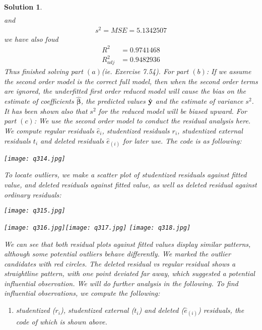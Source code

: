 \documentclass[11pt]{article}
\newtheorem{sol}{Solution}
\begin{document}
\begin{sol}
\begin{align*}
	\end{align*}
	and 
	\begin{align*}
		s^2 = MSE = 5.1342507
	\end{align*}
	we have also foud
	\begin{align*}
		R^2 &= 0.9741468\\
		R^2_{adj} &= 0.9482936
	\end{align*}
	Thus finished solving part $(a)$(ie. Exercise 7.54).\vskip 2mm
	For part $(b)$:\vskip 2mm
	If we assume the second order model is the correct full model, then when the second order terms are ignored, the underfitted first order reduced model will cause the bias on the estimate of coefficients $\hat{{\bm \beta}}$, the predicted values $\hat{{\bf y}}$ and the estimate of variance $s^2$. It has been shown also that $s^2$ for the reduced model will be biased upward.\vskip 2mm
	For part $(c)$:\vskip 2mm
	We use the second order model to conduct the residual analysis here.\vskip 2mm
	We compute regular residuals $\hat{e}_i$, studentized residuals $r_i$, studentized external residuals $t_i$ and deleted residuals $\hat{e}_{(i)}$ for later use. The code is as following:
	\begin{center}
		\texttt{[image: q314.jpg]}
	\end{center}
	To locate outliers, we make a scatter plot of studentized residuals against fitted value, and deleted residuals against fitted value, as well as deleted residual against ordinary residuals:
	\begin{center}
		\texttt{[image: q315.jpg]}
	\end{center}
	\begin{center}
		\texttt{[image: q316.jpg]}\texttt{[image: q317.jpg]}
	\texttt{[image: q318.jpg]}
	\end{center}
	We can see that both residual plots against fitted values display similar patterns, although some potential outliers behave differently. We marked the outlier candidates with red circles. The deleted residual vs regular residual shows a straightline pattern, with one point deviated far away, which suggested a potential influential observation. We will do further analysis in the following.\vskip 2mm
	To find influential observations, we compute the following:
	\begin{enumerate}
		\item studentized ($r_i$), studentized external ($t_i$) and deleted ($\hat{e}_{(i)}$) residuals, the code of which is shown above.

\end{enumerate}
\end{sol}
\end{document}
